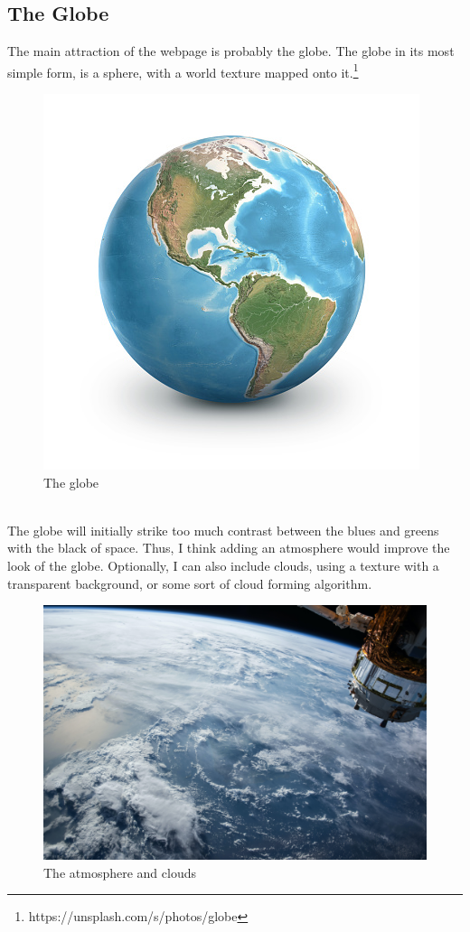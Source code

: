 \subsection{The Globe}
The main attraction of the webpage is probably the globe. The globe in its most simple form, is a sphere, with a world texture mapped onto it.\footnote{https://unsplash.com/s/photos/globe}
\begin{figure}[h]
\centering
\includegraphics[width=0.4\linewidth]{images/globe}
\caption{The globe}
\label{fig:globe}
\end{figure}
\\ The globe will initially strike too much contrast between the blues and greens with the black of space. Thus, I think adding an atmosphere would improve the look of the globe.
Optionally, I can also include clouds, using a texture with a transparent background, or some sort of cloud forming algorithm.
\begin{figure}[h]
\centering
\includegraphics[width=0.4\linewidth]{images/nasa}
\caption{The atmosphere and clouds}
\label{fig:nasa}
\end{figure}
\newpage

